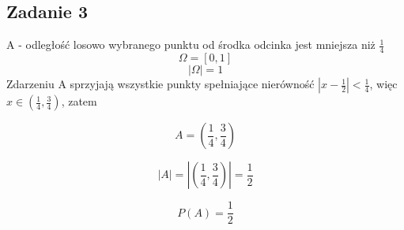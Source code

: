 \subsection{Zadanie 3}

A - odległość losowo wybranego punktu od środka odcinka jest mniejsza niż $\frac{1}{4}$
\[
\Omega=[0, 1]
\]
\[
|\Omega|=1
\]
Zdarzeniu A sprzyjają wszystkie punkty spełniające nierówność
$|x - \frac{1}{2}| < \frac{1}{4}$, więc $x \in(\frac{1}{4}, \frac{3}{4})$, zatem 

\[
A = (\frac{1}{4}, \frac{3}{4})
\]

\[
|A| = |(\frac{1}{4}, \frac{3}{4})| = \frac{1}{2}
\]

\[
P(A) = \frac{1}{2}
\]

